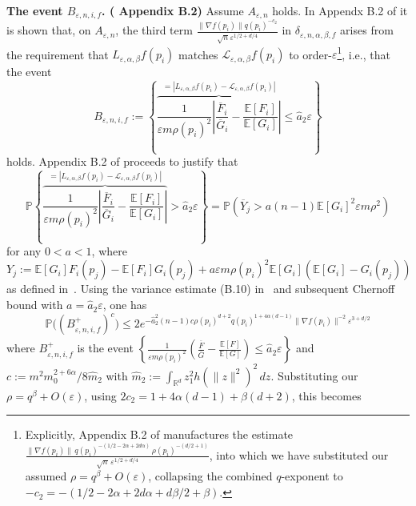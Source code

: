 \documentclass{article}
\theoremstyle{remark}
\theoremstyle{plain}
\begin{document}
{\textbf{The event $B_{\varepsilon,n ,i ,f}$. (\cite{Berry2016} Appendix B.2)}}
Assume $A_{\varepsilon, n}$ holds. In Appendx B.2 of \cite{Berry2016} it is shown that, on $A_{\varepsilon,n}$, the third term $\frac{\|\nabla f(p_{i})\| q(p_{i})^{-c_{2}}}{\sqrt{ n } \varepsilon^{1/2+d/4}}$ in $\delta_{\varepsilon, n, \alpha, \beta, f}$ arises from the requirement that $L_{\varepsilon,\alpha, \beta }f(p_{i})$ matches $\mathcal{L}_{\varepsilon,\alpha, \beta}f(p_{i})$ to order-$\varepsilon$\footnote{Explicitly, Appendix B.2 of \cite{Berry2016} manufactures the estimate $\frac{\|\nabla f(p_{i})\|\, q(p_{i})^{-(1/2 - 2\alpha + 2d\alpha)}\, \rho(p_{i})^{-(d/2+1)}}{\sqrt{n}\, \varepsilon^{1/2 + d/4}}$, into which we have substituted our assumed $\rho = q^{\beta} + O(\varepsilon)$, collapsing the combined $q$-exponent to $-c_{2} = -(1/2 - 2\alpha + 2d\alpha + d\beta/2 + \beta)$.}, i.e., that the event
\begin{equation}
B_{\varepsilon, n ,i, f}:=\left\{ \overbrace{ \frac{1}{\varepsilon m \rho(p_{i})^{2}} \left| \frac{\overline{F}_{i}}{\overline{G}_{i}}- \frac{\mathbb{E}[F_{i}]}{\mathbb{E}[G_{i}]} \right| }^{= |L_{\varepsilon, \alpha , \beta}f(p_{i})-\mathcal{L}_{\varepsilon, \alpha, \beta}f(p_{i})| } \leq  \hat{a}_{2}\varepsilon \right\}
\end{equation}
holds. Appendix B.2 of \cite{Berry2016} proceeds to justify that
\begin{equation}
\mathbb{P}\left\{ \overbrace{ \frac{1}{\varepsilon m \rho(p_{i})^{2}} \left| \frac{\overline{F}_{i}}{\overline{G}_{i}}- \frac{\mathbb{E}[F_{i}]}{\mathbb{E}[G_{i}]} \right| }^{= |L_{\varepsilon, \alpha , \beta}f(p_{i})-\mathcal{L}_{\varepsilon, \alpha, \beta}f(p_{i})| }  >  \hat{a}_{2}\varepsilon \right\}=\mathbb{P} (\overline{Y}_{j}> a(n-1) \mathbb{E}[G_{i}]^{2} \varepsilon m \rho^{2})
\end{equation}
for any $0<a< 1$, where $Y_{j}:=\mathbb{E}[G_{i}] F_{i}(p_{j})- \mathbb{E}[F_{i}]G_{i}(p_{j})+ a \varepsilon m \rho(p_{i})^{2} \mathbb{E}[G_{i}](\mathbb{E}[G_{i}]-G_{i}(p_{j}))$as defined in~\cite{Berry2016}. Using the variance estimate (B.10) in~\cite{Berry2016} and subsequent Chernoff bound with $a=\hat{a}_{2} \varepsilon$, one has
\begin{equation}
\mathbb{P}\big((B_{\varepsilon,n,i,f}^{+})^{c}\big) \leq 2 e^{-\hat{a}_{2}^{2}(n-1)c \rho(p_{i})^{d+2}q(p_{i})^{1+4 \alpha(d-1) } \|\nabla f(p_{i})\|^{-2}\varepsilon^{3+d/2}}
\end{equation}
where $B_{\varepsilon, n ,i, f}^{+}$ is the event $\left\{ \frac{1}{\varepsilon m \rho(p_{i})^{2}} ^{}\left(  \frac{\overline{F}}{\overline{G}}- \frac{\mathbb{E}[F]}{\mathbb{E}[G]}  \right) \leq   \hat{a}_{2} \varepsilon  \right\}$ and $c:=m^{2}m_{0}^{2+6 \alpha} / 8 \hat{m}_{2}$ with $\hat{m}_{2}:=\int_{\mathbb{R}^{d}}z_{1}^{2}h(\|z\|^{2})^{2}\, dz$. Substituting our $\rho=q^{\beta}+O(\varepsilon)$, using $2c_{2}=1+4\alpha(d-1)+\beta(d+2)$, this becomes
\end{document}
